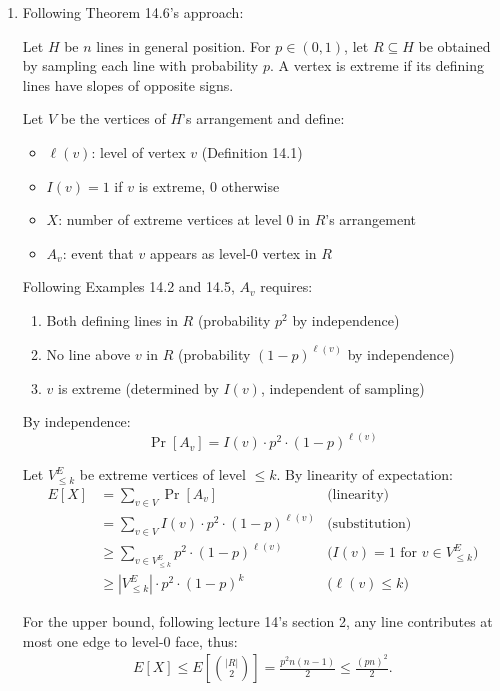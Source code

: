 \documentclass{article}
\begin{document}
  \begin{enumerate}[label=(\alph*)]
  \item Following Theorem 14.6's approach:
  
  Let $H$ be $n$ lines in general position. For $p \in (0,1)$, let $R \subseteq H$ be obtained by sampling each line with probability $p$. A vertex is extreme if its defining lines have slopes of opposite signs.
  
  Let $V$ be the vertices of $H$'s arrangement and define:
  \begin{itemize}
  \item $\ell(v)$: level of vertex $v$ (Definition 14.1)
  \item $I(v) = 1$ if $v$ is extreme, 0 otherwise
  \item $X$: number of extreme vertices at level 0 in $R$'s arrangement
  \item $A_v$: event that $v$ appears as level-0 vertex in $R$
  \end{itemize}
  
  Following Examples 14.2 and 14.5, $A_v$ requires:
  \begin{enumerate}[label=(\roman*)]
  \item Both defining lines in $R$ (probability $p^2$ by independence)
  \item No line above $v$ in $R$ (probability $(1-p)^{\ell(v)}$ by independence)
  \item $v$ is extreme (determined by $I(v)$, independent of sampling)
  \end{enumerate}
  
  By independence:
  \[\Pr[A_v] = I(v) \cdot p^2 \cdot (1-p)^{\ell(v)}\]
  
  Let $V_{\leq k}^E$ be extreme vertices of level $\leq k$. By linearity of expectation:
  \begin{align*}
  E[X] &= \sum_{v \in V} \Pr[A_v] & \text{(linearity)} \\
  &= \sum_{v \in V} I(v) \cdot p^2 \cdot (1-p)^{\ell(v)} & \text{(substitution)} \\
  &\geq \sum_{v \in V_{\leq k}^E} p^2 \cdot (1-p)^{\ell(v)} & \text{($I(v)=1$ for $v \in V_{\leq k}^E$)} \\
  &\geq |V_{\leq k}^E| \cdot p^2 \cdot (1-p)^k & \text{($\ell(v) \leq k$)} \tag{1}
  \end{align*}
  
  For the upper bound, following lecture 14's section 2, any line contributes at most one edge to level-0 face, thus:
  \begin{align*}
    E[X] \leq E[\binom{|R|}{2}] = \frac{p^2 n(n-1)}{2} \leq \frac{(pn)^2}{2}.
  \end{align*}
  

\end{enumerate}
\end{document}
